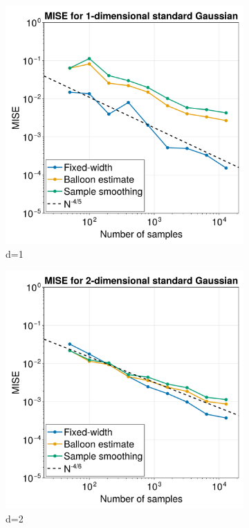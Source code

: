 \documentclass{article}
\begin{document}
\begin{figure}
\begin{subfigure}{.5\textwidth}
  \centering
  \includegraphics[width=.8\linewidth]{images/MISE_d=1.png}
  \caption{d=1}
  \label{fig:MISE-1}
\end{subfigure}%
\begin{subfigure}{.5\textwidth}
  \centering
  \includegraphics[width=.8\linewidth]{images/MISE_d=2.png}
  \caption{d=2}
  \label{fig:MISE-2}
\end{subfigure}
\begin{subfigure}{.5\textwidth}
  \centering

\end{subfigure}
\end{figure}
\end{document}
